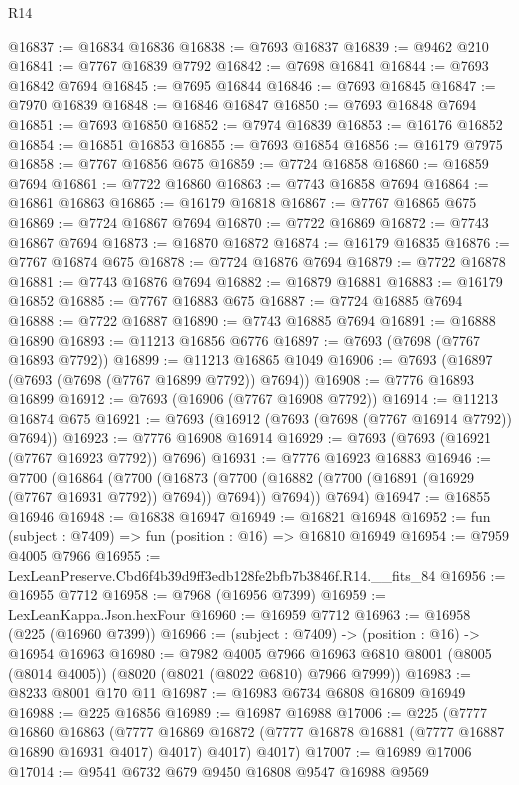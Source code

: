 \begin{lexlean}{R14}
\begin{coremodule}
@16837 := @16834 @16836
@16838 := @7693 @16837
@16839 := @9462 @210
@16841 := @7767 @16839 @7792
@16842 := @7698 @16841
@16844 := @7693 @16842 @7694
@16845 := @7695 @16844
@16846 := @7693 @16845
@16847 := @7970 @16839
@16848 := @16846 @16847
@16850 := @7693 @16848 @7694
@16851 := @7693 @16850
@16852 := @7974 @16839
@16853 := @16176 @16852
@16854 := @16851 @16853
@16855 := @7693 @16854
@16856 := @16179 @7975
@16858 := @7767 @16856 @675
@16859 := @7724 @16858
@16860 := @16859 @7694
@16861 := @7722 @16860
@16863 := @7743 @16858 @7694
@16864 := @16861 @16863
@16865 := @16179 @16818
@16867 := @7767 @16865 @675
@16869 := @7724 @16867 @7694
@16870 := @7722 @16869
@16872 := @7743 @16867 @7694
@16873 := @16870 @16872
@16874 := @16179 @16835
@16876 := @7767 @16874 @675
@16878 := @7724 @16876 @7694
@16879 := @7722 @16878
@16881 := @7743 @16876 @7694
@16882 := @16879 @16881
@16883 := @16179 @16852
@16885 := @7767 @16883 @675
@16887 := @7724 @16885 @7694
@16888 := @7722 @16887
@16890 := @7743 @16885 @7694
@16891 := @16888 @16890
@16893 := @11213 @16856 @6776
@16897 := @7693 (@7698 (@7767 @16893 @7792))
@16899 := @11213 @16865 @1049
@16906 := @7693 (@16897 (@7693 (@7698 (@7767 @16899 @7792)) @7694))
@16908 := @7776 @16893 @16899
@16912 := @7693 (@16906 (@7767 @16908 @7792))
@16914 := @11213 @16874 @675
@16921 := @7693 (@16912 (@7693 (@7698 (@7767 @16914 @7792)) @7694))
@16923 := @7776 @16908 @16914
@16929 := @7693 (@7693 (@16921 (@7767 @16923 @7792)) @7696)
@16931 := @7776 @16923 @16883
@16946 := @7700
    (@16864
      (@7700
        (@16873 (@7700 (@16882 (@7700 (@16891 (@16929 (@7767 @16931 @7792)) @7694)) @7694)) @7694))
      @7694)
@16947 := @16855 @16946
@16948 := @16838 @16947
@16949 := @16821 @16948
@16952 := fun (subject : @7409) => fun (position : @16) => @16810 @16949
@16954 := @7959 @4005 @7966
@16955 := LexLeanPreserve.Cbd6f4b39d9ff3edb128fe2bfb7b3846f.R14.__fits_84
@16956 := @16955 @7712
@16958 := @7968 (@16956 @7399)
@16959 := LexLeanKappa.Json.hexFour
@16960 := @16959 @7712
@16963 := @16958 (@225 (@16960 @7399))
@16966 := (subject : @7409) -> (position : @16) -> @16954 @16963
@16980 := @7982
    @4005
    @7966
    @16963
    @6810
    @8001
    (@8005 (@8014 @4005))
    (@8020 (@8021 (@8022 @6810) @7966 @7999))
@16983 := @8233 @8001 @170 @11
@16987 := @16983 @6734 @6808 @16809 @16949
@16988 := @225 @16856
@16989 := @16987 @16988
@17006 := @225
    (@7777
      @16860
      @16863
      (@7777 @16869 @16872 (@7777 @16878 @16881 (@7777 @16887 @16890 @16931 @4017) @4017) @4017)
      @4017)
@17007 := @16989 @17006
@17014 := @9541 @6732 @679 @9450 @16808 @9547 @16988 @9569

\end{coremodule}
\end{lexlean}
